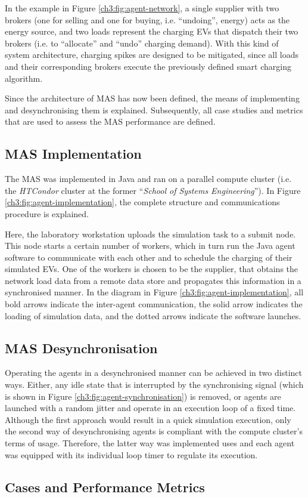 In the example in Figure \ref{ch3:fig:agent-network}, a single supplier with two brokers (one for selling and one for buying, i.e. ``undoing'', energy) acts as the energy source, and two loads represent the charging EVs that dispatch their two brokers (i.e. to ``allocate'' and ``undo'' charging demand).
With this kind of system architecture, charging spikes are designed to be mitigated, since all loads and their corresponding brokers execute the previously defined smart charging algorithm.

Since the architecture of MAS has now been defined, the means of implementing and desynchronising them is explained.
Subsequently, all case studies and metrics that are used to assess the MAS performance are defined.

\subsection{MAS Implementation}
\label{ch3:subsec:implementation}

The MAS was implemented in Java and ran on a parallel compute cluster (i.e. the \textit{HTCondor} cluster at the former ``\textit{School of Systems Engineering}'').
In Figure \ref{ch3:fig:agent-implementation}, the complete structure and communications procedure is explained.



Here, the laboratory workstation uploads the simulation task to a submit node.
This node starts a certain number of workers, which in turn run the Java agent software to communicate with each other and to schedule the charging of their simulated EVs.
One of the workers is chosen to be the supplier, that obtains the network load data from a remote data store and propagates this information in a synchronised manner.
In the diagram in Figure \ref{ch3:fig:agent-implementation}, all bold arrows indicate the inter-agent communication, the solid arrow indicates the loading of simulation data, and the dotted arrows indicate the software launches.

\subsection{MAS Desynchronisation}
\label{ch3:subsec:desynchronisation}

Operating the agents in a desynchronised manner can be achieved in two distinct ways.
Either, any idle state that is interrupted by the synchronising signal (which is shown in Figure \ref{ch3:fig:agent-synchronisation}) is removed, or agents are launched with a random jitter and operate in an execution loop of a fixed time.
Although the first approach would result in a quick simulation execution, only the second way of desynchronising agents is compliant with the compute cluster's terms of usage.
Therefore, the latter way was implemented uses and each agent was equipped with its individual loop timer to regulate its execution.

\subsection{Cases and Performance Metrics}
\label{ch3:subsec:cases-and-metrics}









